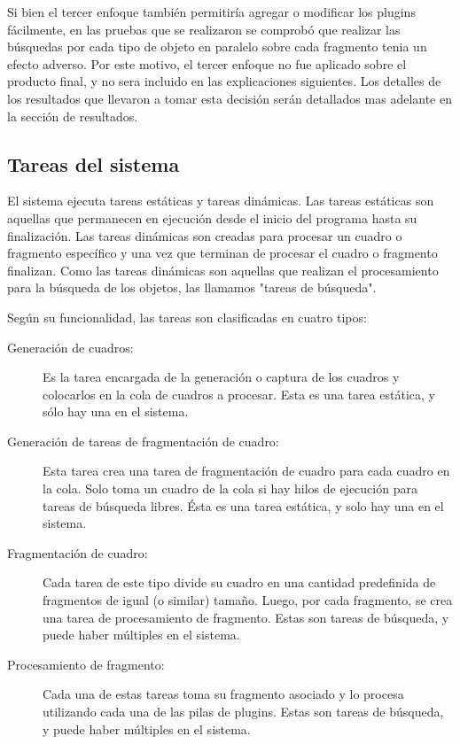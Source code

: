 Si bien el tercer enfoque también permitiría agregar o modificar los plugins
fácilmente, en las pruebas que se realizaron se comprobó que realizar las
búsquedas por cada tipo de objeto en paralelo sobre cada fragmento tenia un
efecto adverso. Por este motivo, el tercer enfoque no fue aplicado sobre el
producto final, y no sera incluido en las explicaciones siguientes. Los detalles
de los resultados que llevaron a tomar esta decisión serán detallados mas
adelante en la sección de resultados.

\subsection{Tareas del sistema}

El sistema ejecuta tareas estáticas y tareas dinámicas. Las tareas estáticas son
aquellas que permanecen en ejecución desde el inicio del programa hasta su
finalización. Las tareas dinámicas son creadas para procesar un cuadro o
fragmento específico y una vez que terminan de procesar el cuadro o fragmento
finalizan. Como las tareas dinámicas son aquellas que realizan el procesamiento
para la búsqueda de los objetos, las llamamos "tareas de búsqueda".

Según su funcionalidad, las tareas son clasificadas en cuatro tipos:

\begin{description}

	\item[Generación de cuadros:] Es la tarea encargada de la generación o
		captura de los cuadros y colocarlos en la cola de cuadros a
		procesar. Esta es una tarea estática, y sólo hay una en el
		sistema.

	\item[Generación de tareas de fragmentación de cuadro:] Esta tarea crea
		una tarea de fragmentación de cuadro para cada cuadro en la
		cola. Solo toma un cuadro de la cola si hay hilos de ejecución
		para tareas de búsqueda libres. Ésta es una tarea estática, y
		solo hay una en el sistema.

	\item[Fragmentación de cuadro:] Cada tarea de este tipo divide su cuadro
		en una cantidad predefinida de fragmentos de igual (o similar)
		tamaño. Luego, por cada fragmento, se crea una tarea de
		procesamiento de fragmento. Estas son tareas de búsqueda, y
		puede haber múltiples en el sistema.

	\item[Procesamiento de fragmento:] Cada una de estas tareas toma su
		fragmento asociado y lo procesa utilizando cada una de las pilas
		de plugins. Estas son tareas de búsqueda, y puede haber
		múltiples en el sistema.

\end{description}

